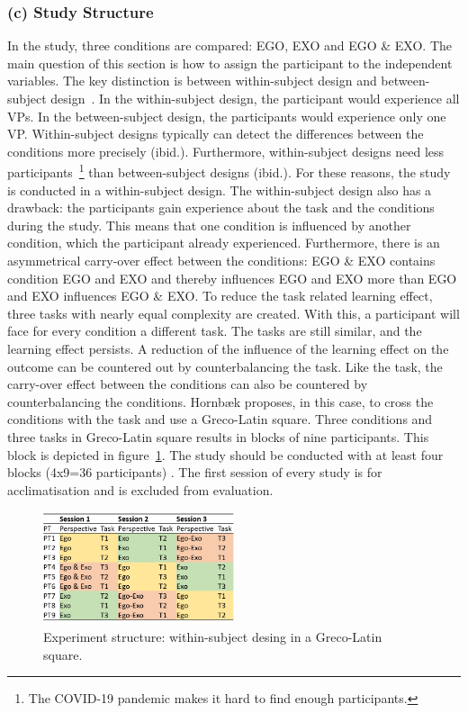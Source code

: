 \subsubsection{(c) Study Structure}
\label{sec:studyStructure}
In the study, three conditions are compared: EGO, EXO and EGO \& EXO. The main question of this section is how to assign the participant to the independent variables. The key distinction is between within-subject design and between-subject design~\cite{hornbaek}. In the within-subject design, the participant would experience all VPs. In the between-subject design, the participants would experience only one VP. Within-subject designs typically can detect the differences between the conditions more precisely (ibid.). Furthermore, within-subject designs need less participants~\footnote{The COVID-19 pandemic makes it hard to find enough participants.} than between-subject designs (ibid.). For these reasons, the study is conducted in a within-subject design.
The within-subject design also has a drawback: the participants gain experience about the task and the conditions during the study. This means that one condition is influenced by another condition, which the participant already experienced. Furthermore, there is an asymmetrical carry-over effect between the conditions: EGO \& EXO contains condition EGO and EXO and thereby influences EGO and EXO more than EGO and EXO influences EGO \& EXO. To reduce the task related learning effect, three tasks with nearly equal complexity are created. With this, a participant will face for every condition a different task. The tasks are still similar, and the learning effect persists. A reduction of the influence of the learning effect on the outcome can be countered out by counterbalancing the task. Like the task, the carry-over effect between the conditions can also be countered by counterbalancing the conditions. Hornb\ae{}k proposes, in this case, to cross the conditions with the task and use a Greco-Latin square. Three conditions and three tasks in Greco-Latin square results in blocks of nine participants. This block is depicted in figure~\ref{fig:study_session_plan}. The study should be conducted with at least four blocks (4x9=36 participants) . The first session of every study is for acclimatisation and is excluded from evaluation.

\begin{figure}[htb]
	\centering
	\includegraphics[width=0.5\textwidth]{figures/study_session_plan.png}
	\caption[Study structure]{Experiment structure: within-subject desing in a Greco-Latin square.}
	\label{fig:study_session_plan}
\end{figure}

